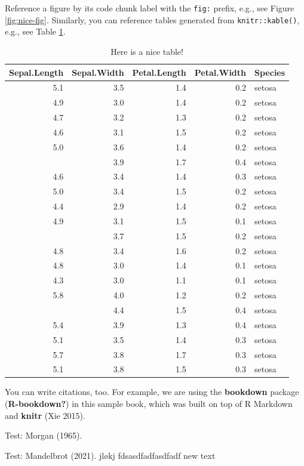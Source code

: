 \documentclass[
  12pt,
]{book}
\begin{document}
Reference a figure by its code chunk label with the \texttt{fig:} prefix, e.g., see Figure \ref{fig:nice-fig}. Similarly, you can reference tables generated from \texttt{knitr::kable()}, e.g., see Table \ref{tab:nice-tab}.

\begin{table}

\caption{\label{tab:nice-tab}Here is a nice table!}
\centering
\begin{tabular}[t]{rrrrl}
\toprule
Sepal.Length & Sepal.Width & Petal.Length & Petal.Width & Species\\
\midrule
5.1 & 3.5 & 1.4 & 0.2 & setosa\\
4.9 & 3.0 & 1.4 & 0.2 & setosa\\
4.7 & 3.2 & 1.3 & 0.2 & setosa\\
4.6 & 3.1 & 1.5 & 0.2 & setosa\\
5.0 & 3.6 & 1.4 & 0.2 & setosa\\
\addlinespace
5.4 & 3.9 & 1.7 & 0.4 & setosa\\
4.6 & 3.4 & 1.4 & 0.3 & setosa\\
5.0 & 3.4 & 1.5 & 0.2 & setosa\\
4.4 & 2.9 & 1.4 & 0.2 & setosa\\
4.9 & 3.1 & 1.5 & 0.1 & setosa\\
\addlinespace
5.4 & 3.7 & 1.5 & 0.2 & setosa\\
4.8 & 3.4 & 1.6 & 0.2 & setosa\\
4.8 & 3.0 & 1.4 & 0.1 & setosa\\
4.3 & 3.0 & 1.1 & 0.1 & setosa\\
5.8 & 4.0 & 1.2 & 0.2 & setosa\\
\addlinespace
5.7 & 4.4 & 1.5 & 0.4 & setosa\\
5.4 & 3.9 & 1.3 & 0.4 & setosa\\
5.1 & 3.5 & 1.4 & 0.3 & setosa\\
5.7 & 3.8 & 1.7 & 0.3 & setosa\\
5.1 & 3.8 & 1.5 & 0.3 & setosa\\
\bottomrule
\end{tabular}
\end{table}

You can write citations, too. For example, we are using the \textbf{bookdown} package (\textbf{R-bookdown?}) in this sample book, which was built on top of R Markdown and \textbf{knitr} (Xie 2015).

Test: Morgan (1965).

Test: Mandelbrot (2021). jløkj fdsasdfadfasdfadf new text
\end{document}
